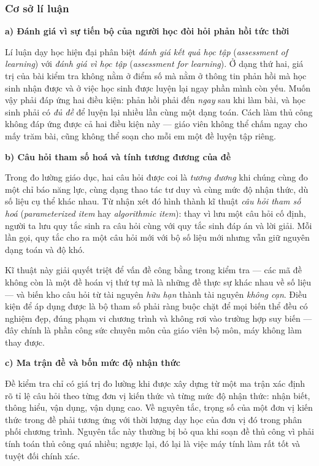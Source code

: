 
\subsubsection{Cơ sở lí luận}

\textbf{a) Đánh giá vì sự tiến bộ của người học đòi hỏi phản hồi tức thời}

Lí luận dạy học hiện đại phân biệt \textit{đánh giá kết quả học tập}
(\textit{assessment of learning}) với \textit{đánh giá vì học tập}
(\textit{assessment for learning}). Ở dạng thứ hai, giá trị của bài kiểm tra
không nằm ở điểm số mà nằm ở thông tin phản hồi mà học sinh nhận được và ở
việc học sinh được luyện lại ngay phần mình còn yếu. Muốn vậy phải đáp ứng hai
điều kiện: phản hồi phải đến \textit{ngay} sau khi làm bài, và học sinh phải
có \textit{đủ đề} để luyện lại nhiều lần cùng một dạng toán. Cách làm thủ công
không đáp ứng được cả hai điều kiện này --- giáo viên không thể chấm ngay cho
mấy trăm bài, cũng không thể soạn cho mỗi em một đề luyện tập riêng.

\textbf{b) Câu hỏi tham số hoá và tính tương đương của đề}

Trong đo lường giáo dục, hai câu hỏi được coi là \textit{tương đương} khi
chúng cùng đo một chỉ báo năng lực, cùng dạng thao tác tư duy và cùng mức độ
nhận thức, dù số liệu cụ thể khác nhau. Từ nhận xét đó hình thành kĩ thuật
\textit{câu hỏi tham số hoá} (\textit{parameterized item} hay
\textit{algorithmic item}): thay vì lưu một câu hỏi cố định, người ta lưu quy
tắc sinh ra câu hỏi cùng với quy tắc sinh đáp án và lời giải. Mỗi lần gọi, quy
tắc cho ra một câu hỏi mới với bộ số liệu mới nhưng vẫn giữ nguyên dạng toán
và độ khó.

Kĩ thuật này giải quyết triệt để vấn đề công bằng trong kiểm tra --- các mã đề
không còn là một đề hoán vị thứ tự mà là những đề thực sự khác nhau về số liệu
--- và biến kho câu hỏi từ tài nguyên \textit{hữu hạn} thành tài nguyên
\textit{không cạn}. Điều kiện để áp dụng được là bộ tham số phải ràng buộc chặt
để mọi biến thể đều có nghiệm đẹp, đúng phạm vi chương trình và không rơi vào
trường hợp suy biến --- đây chính là phần công sức chuyên môn của giáo viên bộ
môn, máy không làm thay được.

\textbf{c) Ma trận đề và bốn mức độ nhận thức}

Đề kiểm tra chỉ có giá trị đo lường khi được xây dựng từ một ma trận xác định
rõ tỉ lệ câu hỏi theo từng đơn vị kiến thức và từng mức độ nhận thức: nhận
biết, thông hiểu, vận dụng, vận dụng cao. Về nguyên tắc, trọng số của một đơn
vị kiến thức trong đề phải tương ứng với thời lượng dạy học của đơn vị đó
trong phân phối chương trình. Nguyên tắc này thường bị bỏ qua khi soạn đề thủ
công vì phải tính toán thủ công quá nhiều; ngược lại, đó lại là việc máy tính
làm rất tốt và tuyệt đối chính xác.

